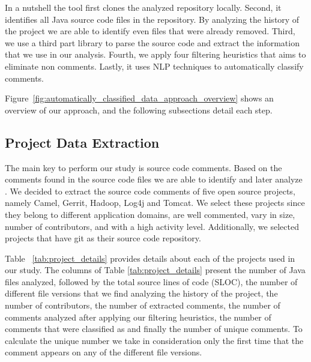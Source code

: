 In a nutshell the tool first clones the analyzed repository locally. Second, it identifies all Java source code files in the repository. By analyzing the history of the project we are able to identify even files that were already removed. Third, we use a third part library to parse the source code and extract the information that we use in our analysis. Fourth, we apply four filtering heuristics that aims to eliminate non \SATD comments. Lastly, it uses NLP techniques to automatically classify \SATD comments. 

Figure~\ref{fig:automatically_classified_data_approach_overview} shows an overview of our approach, and the following subsections detail each step.

\subsection{Project Data Extraction}
\label{sub:project_data_extraction}

The main key to perform our study is source code comments. Based on the comments found in the source code files we are able to identify and later analyze \SATD. We decided to extract the source code comments of five open source projects, namely Camel, Gerrit, Hadoop, Log4j and Tomcat. We select these projects since they belong to different application domains, are well commented, vary in size, number of contributors, and with a high activity level. Additionally, we selected projects that have git as their source code repository.

Table ~\ref{tab:project_details} provides details about each of the projects used in our study. The columns of Table \ref{tab:project_details} present the number of Java files analyzed, followed by the total source lines of code (SLOC), the number of different file versions that we find analyzing the history of the project, the number of contributors, the number of extracted comments, the number of comments analyzed after applying our filtering heuristics, the number of comments that were classified as \SATD and finally the number of unique \SATD comments. To calculate the unique \SATD number we take in consideration only the first time that the comment appears on any of the different file versions. 

